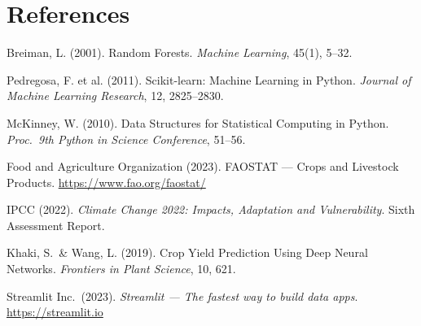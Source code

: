 \documentclass[12pt,a4paper]{article}
\begin{document}
\section*{References}

\begin{enumerate}[leftmargin=2em, label={[\arabic*]}]
  \item Breiman, L. (2001). Random Forests. \textit{Machine Learning}, 45(1), 5--32.
  \item Pedregosa, F. et al. (2011). Scikit-learn: Machine Learning in Python.
        \textit{Journal of Machine Learning Research}, 12, 2825--2830.
  \item McKinney, W. (2010). Data Structures for Statistical Computing in Python.
        \textit{Proc.\ 9th Python in Science Conference}, 51--56.
  \item Food and Agriculture Organization (2023). FAOSTAT --- Crops and Livestock
        Products. \url{https://www.fao.org/faostat/}
  \item IPCC (2022). \textit{Climate Change 2022: Impacts, Adaptation and Vulnerability}.
        Sixth Assessment Report.
  \item Khaki, S.\ \& Wang, L. (2019). Crop Yield Prediction Using Deep Neural Networks.
        \textit{Frontiers in Plant Science}, 10, 621.
  \item Streamlit Inc.\ (2023). \textit{Streamlit --- The fastest way to build data apps}.
        \url{https://streamlit.io}
\end{enumerate}
\end{document}

